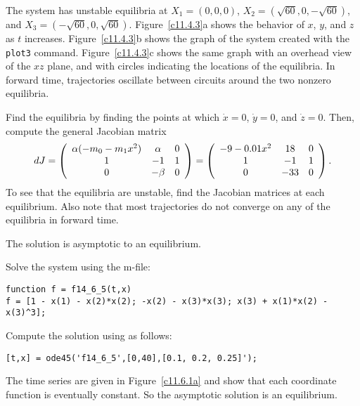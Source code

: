 \ans The system has unstable equilibria at $X_1 = (0,0,0)$,
$X_2 = (\sqrt{60},0, -\sqrt{60})$, and $X_3 = (-\sqrt{60},0,\sqrt{60})$.
Figure~\ref{c11.4.3}a shows the behavior of $x$, $y$, and $z$ as $t$
increases.  Figure~\ref{c11.4.3}b shows the graph of the system created
with the {\tt plot3} command.  Figure~\ref{c11.4.3}c shows the same graph
with an overhead view of the $xz$ plane, and with circles indicating the
locations of the equilibria.  In forward time, trajectories oscillate
between circuits around the two nonzero equilibria.

\soln Find the equilibria by finding the points at which $\dot{x} = 0$,
$\dot{y} = 0$, and $\dot{z} = 0$.  Then, compute the general Jacobian
matrix
\[
dJ = \left(\begin{array}{ccc} \alpha(-m_0 - m_1x^2) & \alpha & 0 \\ 1 & -1 & 1 \\ 0 & -\beta & 0\end{array}\right)
= \left(\begin{array}{ccc} -9 - 0.01x^2 & 18 & 0 \\ 1 & -1 & 1 \\ 0 & -33 & 0\end{array}\right).
\]
To see that the equilibria are unstable, find the Jacobian matrices at
each equilibrium.  Also note that most trajectories do not converge on
any of the equilibria in forward time.

\begin{figure}[htb]
                       \centerline{%
			\hspace{0.5in}
			\hspace{0.3in}
                       }
\end{figure}

 \ans The solution is asymptotic to an equilibrium.

\soln Solve the system using the m-file:
\begin{verbatim}
function f = f14_6_5(t,x)
f = [1 - x(1) - x(2)*x(2); -x(2) - x(3)*x(3); x(3) + x(1)*x(2) - x(3)^3];
\end{verbatim}

Compute the solution using \Matlab as follows:
\begin{verbatim}
[t,x] = ode45('f14_6_5',[0,40],[0.1, 0.2, 0.25]');
\end{verbatim}
\begin{figure}[htb]
     \centerline{%
     }
\end{figure}
The time series are given in Figure~\ref{c11.6.1a} and show
that each coordinate function is eventually constant.  So the asymptotic
solution is an equilibrium.

